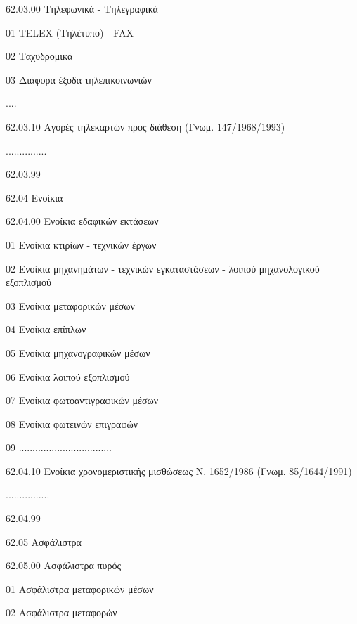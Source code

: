 \documentclass[A4,10pt,greek]{book}
\begin{document}
                    62.03.00   Τηλεφωνικά - Τηλεγραφικά

                                01    TELEX (Τηλέτυπο) - FAX

                                02   Ταχυδρομικά

                                03   Διάφορα έξοδα τηλεπικοινωνιών

                                ....

                    62.03.10   Αγορές τηλεκαρτών προς διάθεση (Γνωμ. 147/1968/1993)

                    ...............

                    62.03.99

        62.04   Ενοίκια

                    62.04.00    Ενοίκια εδαφικών εκτάσεων

                                01   Ενοίκια κτιρίων - τεχνικών έργων

                                02   Ενοίκια μηχανημάτων - τεχνικών εγκαταστάσεων - λοιπού
                                        μηχανολογικού εξοπλισμού

                                03   Ενοίκια μεταφορικών μέσων

                                04   Ενοίκια επίπλων

                                05   Ενοίκια μηχανογραφικών μέσων

                                06   Ενοίκια λοιπού εξοπλισμού

                                07   Ενοίκια φωτοαντιγραφικών μέσων

                                08   Ενοίκια φωτεινών επιγραφών

                                09   ..................................

                    62.04.10   Ενοίκια χρονομεριστικής μισθώσεως Ν. 1652/1986
                                      (Γνωμ. 85/1644/1991)

                    ................

                    62.04.99

        62.05   Ασφάλιστρα

                    62.05.00    Ασφάλιστρα πυρός

                                01   Ασφάλιστρα μεταφορικών μέσων

                                02   Ασφάλιστρα μεταφορών
\end{document}
